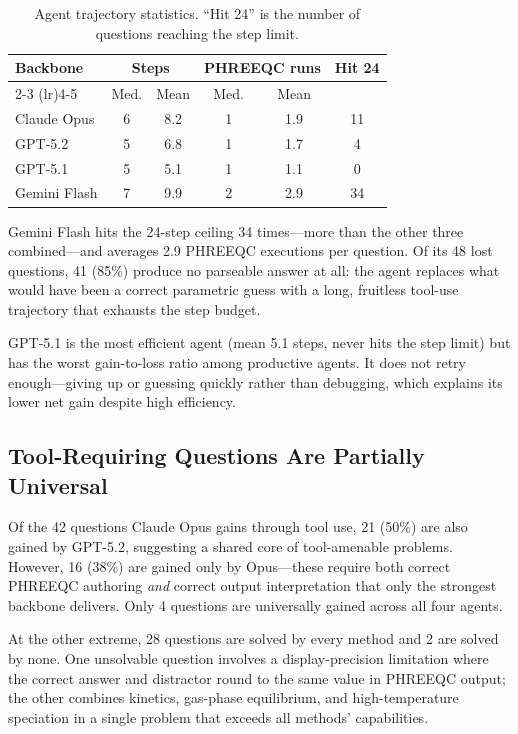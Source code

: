 \documentclass[sigconf,anonymous]{acmart}
\begin{document}
\begin{table}[h]
\centering
\small
\begin{tabular}{lccccc}
\toprule
Backbone & \multicolumn{2}{c}{Steps} &
  \multicolumn{2}{c}{PHREEQC runs} & Hit 24 \\
\cmidrule(lr){2-3} \cmidrule(lr){4-5}
 & Med. & Mean & Med. & Mean & \\
\midrule
Claude Opus & 6 & 8.2 & 1 & 1.9 & 11 \\
GPT-5.2 & 5 & 6.8 & 1 & 1.7 & 4 \\
GPT-5.1 & 5 & 5.1 & 1 & 1.1 & 0 \\
Gemini Flash & 7 & 9.9 & 2 & 2.9 & 34 \\
\bottomrule
\end{tabular}
\caption{Agent trajectory statistics. ``Hit 24''
is the number of questions reaching the step limit.}
\label{tab:trajectory}
\end{table}

Gemini Flash hits the 24-step ceiling 34 times---more
than the other three combined---and averages 2.9
PHREEQC executions per question. Of its 48 lost
questions, 41 (85\%) produce no parseable answer at
all: the agent replaces what would have been a
correct parametric guess with a long, fruitless
tool-use trajectory that exhausts the step budget.

GPT-5.1 is the most efficient agent (mean 5.1 steps,
never hits the step limit) but has the worst
gain-to-loss ratio among productive agents. It does
not retry enough---giving up or guessing quickly
rather than debugging, which explains its lower net
gain despite high efficiency.

\subsection{Tool-Requiring Questions Are Partially Universal}
Of the 42 questions Claude Opus gains through tool
use, 21 (50\%) are also gained by GPT-5.2, suggesting
a shared core of tool-amenable problems. However,
16 (38\%) are gained only by Opus---these require
both correct PHREEQC authoring \emph{and} correct
output interpretation that only the strongest
backbone delivers. Only 4 questions are universally
gained across all four agents.

At the other extreme, 28 questions are solved by
every method and 2 are solved by none. One unsolvable
question involves a display-precision limitation
where the correct answer and distractor round to the
same value in PHREEQC output; the other combines
kinetics, gas-phase equilibrium, and high-temperature
speciation in a single problem that exceeds all
methods' capabilities.
\end{document}
